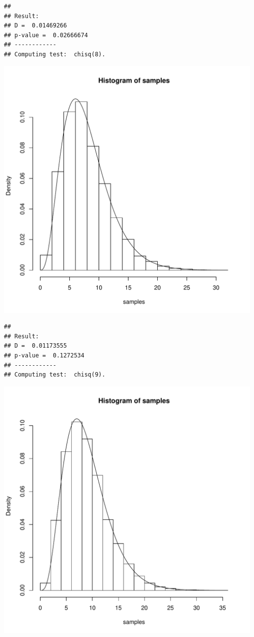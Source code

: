 \documentclass{llncs}\usepackage[]{graphicx}\usepackage[]{color}
\makeatletter
\def\maxwidth{ %
  \ifdim\Gin@nat@width>\linewidth
    \linewidth
  \else
    \Gin@nat@width
  \fi
}
\newenvironment{kframe}{%
 \def\at@end@of@kframe{}%
 \ifinner\ifhmode%
  \def\at@end@of@kframe{\end{minipage}}%
  \begin{minipage}{\columnwidth}%
 \fi\fi%
 \def\FrameCommand##1{\hskip\@totalleftmargin \hskip-\fboxsep
 \colorbox{shadecolor}{##1}\hskip-\fboxsep
     \hskip-\linewidth \hskip-\@totalleftmargin \hskip\columnwidth}%
 \MakeFramed {\advance\hsize-\width
   \@totalleftmargin\z@ \linewidth\hsize
   \@setminipage}}%
 {\par\unskip\endMakeFramed%
 \at@end@of@kframe}
\newenvironment{knitrout}{}{} %
\makeatother
\begin{document}
\begin{knitrout}
\begin{kframe}\begin{lstlisting}[basicstyle=\ttfamily,breaklines=true]
## 
## Result:
## D =  0.01469266 
## p-value =  0.02666674 
## ------------
## Computing test:  chisq(8).
\end{lstlisting}
\end{kframe}
\includegraphics[width=\maxwidth]{figure/Rt-10} 
\begin{kframe}\begin{lstlisting}[basicstyle=\ttfamily,breaklines=true]
## 
## Result:
## D =  0.01173555 
## p-value =  0.1272534 
## ------------
## Computing test:  chisq(9).
\end{lstlisting}
\end{kframe}
\includegraphics[width=\maxwidth]{figure/Rt-11} 

\end{knitrout}
\end{document}
